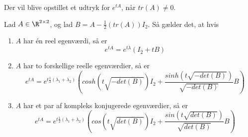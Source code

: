 Der vil blive opstillet et udtryk for $e^{tA}$, når $tr(A) \neq 0$. 

\begin{minipage}\textwidth
\begin{thmx} \textbf{}\label{sæt:løsning_2_x_2_ved_egenværdier_etA_beregning} %
\newline
Lad $A\in \R^{2\times 2}$, og lad $B = A - \frac{1}{2}\left(tr(A)\right)I_2$. Så gælder det, at hvis 
\begin{enumerate}
    \item $A$ har én reel egenværdi, så er $$e^{tA}=e^{t\lambda}(I_2+tB)$$
    \item $A$ har to forskellige reelle egenværdier, så er $$e^{tA}=e^{t\frac{1}{2}(\lambda_1+\lambda_2)}\left(cosh\left(t\sqrt{-det(B)}\right)I_2+\frac{sinh\left(t\sqrt{-det(B)}\right)}{\sqrt{-det(B)}}B\right)$$
    \item $A$ har et par af kompleks konjugerede egenværdier, så er $$e^{tA}=e^{t\frac{1}{2}(\lambda_1+\lambda_2)}\left(cos\left(t\sqrt{det(B)}\right)I_2+\frac{sin\left(t\sqrt{det(B)}\right)}{\sqrt{det(B)}}B\right)$$
\end{enumerate}  
\end{thmx}
\end{minipage}

